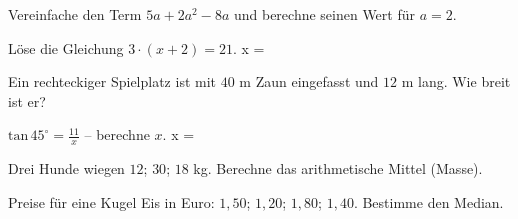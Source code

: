 \documentclass[11pt]{article}
\begin{document}
\noindent\begin{minipage}[t]{0.485\linewidth}\raggedright
\begin{aufgabe}{Vereinfache den Term $5a + 2a^2 - 8a$ und berechne seinen Wert für $a = 2$.}
\end{aufgabe}
\end{minipage}\hfill\begin{minipage}[t]{0.485\linewidth}\raggedright
\begin{aufgabe}{Löse die Gleichung $3 \cdot (x + 2) = 21$. x = \leerfeld}
\end{aufgabe}
\end{minipage}\par

\noindent\begin{minipage}[t]{0.485\linewidth}\raggedright
\begin{aufgabe}{Ein rechteckiger Spielplatz ist mit $40$ m Zaun eingefasst und $12$ m lang. Wie breit ist er? \leerfeld[m]}
\end{aufgabe}
\end{minipage}\hfill\begin{minipage}[t]{0.485\linewidth}\raggedright
\begin{aufgabe}{$\mathrm{tan}\,45^\circ = \frac{11}{x}$ – berechne $x$. x = \leerfeld}
\end{aufgabe}
\end{minipage}\par

\noindent\begin{minipage}[t]{0.485\linewidth}\raggedright
\begin{aufgabe}{Drei Hunde wiegen $12$; $30$; $18$ kg. Berechne das arithmetische Mittel (Masse). \leerfeld[kg]}
\end{aufgabe}
\end{minipage}\hfill\begin{minipage}[t]{0.485\linewidth}\raggedright
\begin{aufgabe}{Preise für eine Kugel Eis in Euro: $1{,}50$; $1{,}20$; $1{,}80$; $1{,}40$. Bestimme den Median. \leerfeld[€]}
\end{aufgabe}
\end{minipage}\par
\end{document}
